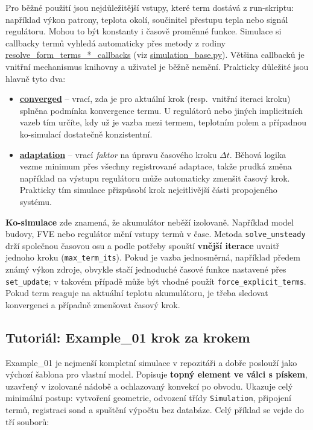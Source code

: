 \documentclass[a4paper,11pt]{article}
\begin{document}
{\sloppy
\begingroup
{}%
Pro běžné použití jsou nejdůležitější vstupy, které term dostává z run-skriptu:
například výkon patrony, teplota okolí, součinitel přestupu tepla nebo signál
regulátoru. Mohou to být konstanty i časově proměnné funkce. Simulace si
callbacky termů vyhledá automaticky přes metody z rodiny
\url{resolve_form_terms_*_callbacks} (viz \url{simulation_base.py}). Většina
callbacků je vnitřní mechanismus knihovny a uživatel je běžně nemění. Prakticky
důležité jsou hlavně tyto dva:
\endgroup

\begin{itemize}
  \item \textbf{\url{converged}} -- vrací, zda je pro aktuální krok (resp.\
        vnitřní iteraci kroku) splněna podmínka konvergence termu. U regulátorů
        nebo jiných implicitních vazeb tím určíte, kdy už je vazba mezi termem,
        teplotním polem a případnou ko-simulací dostatečně konzistentní.
  \item \textbf{\url{adaptation}} -- vrací \emph{faktor} na úpravu časového kroku
        $\Delta t$. Běhová logika vezme minimum přes všechny registrované adaptace,
        takže prudká změna například na výstupu regulátoru může automaticky
        zmenšit časový krok. Prakticky tím simulace přizpůsobí krok
        nejcitlivější části propojeného systému.
\end{itemize}
\par}

\textbf{Ko-simulace} zde znamená, že akumulátor neběží izolovaně. Například
model budovy, FVE nebo regulátor mění vstupy termů v čase. Metoda
\texttt{solve\_unsteady} drží společnou časovou osu a podle potřeby spouští
\textbf{vnější iterace} uvnitř jednoho kroku (\texttt{max\_term\_its}). Pokud je
vazba jednosměrná, například předem známý výkon zdroje, obvykle stačí jednoduché
časové funkce nastavené přes \texttt{set\_update}; v takovém případě může být
vhodné použít \texttt{force\_explicit\_terms}. Pokud term reaguje na aktuální
teplotu akumulátoru, je třeba sledovat konvergenci a případně zmenšovat časový
krok.

\subsection{Tutoriál: Example\_01 krok za krokem}\label{sec:tutorial}

Example\_01 je nejmenší kompletní simulace v repozitáři a dobře poslouží jako
výchozí šablona pro vlastní model. Popisuje \textbf{topný element ve válci
s pískem}, uzavřený v izolované nádobě a ochlazovaný konvekcí po obvodu. Ukazuje
celý minimální postup: vytvoření geometrie, odvození třídy \texttt{Simulation},
připojení termů, registraci sond a spuštění výpočtu bez databáze. Celý příklad
se vejde do tří souborů:
\end{document}
